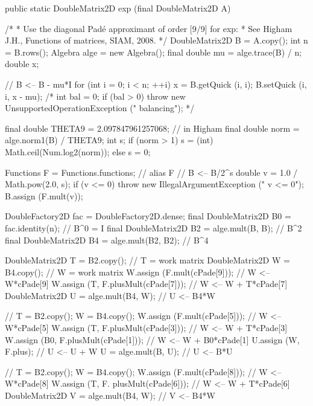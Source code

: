 \begin{code}

   public static DoubleMatrix2D exp (final DoubleMatrix2D A) \begin{hide} {
      /*
       * Use the diagonal Padé approximant of order [9/9] for exp:
       * See Higham J.H., Functions of matrices, SIAM, 2008.
       */
      DoubleMatrix2D B = A.copy();
      int n = B.rows();
      Algebra alge = new Algebra();
      final double mu = alge.trace(B) / n;
      double x;

      // B <-- B - mu*I
      for (int i = 0; i < n; ++i) {
         x = B.getQuick (i, i);
         B.setQuick (i, i, x - mu);
      }
      /*
      int bal = 0;
      if (bal > 0) {
         throw new UnsupportedOperationException ("   balancing");
      } */

      final double THETA9 = 2.097847961257068;   // in Higham
      final double norm = alge.norm1(B) / THETA9;
      int s;
      if (norm > 1)
         s = (int) Math.ceil(Num.log2(norm));
      else
         s = 0;

      Functions F = Functions.functions;    // alias F
      // B <-- B/2^s
      double v = 1.0 / Math.pow(2.0, s);
      if (v <= 0)
          throw new IllegalArgumentException ("   v <= 0");
      B.assign (F.mult(v));

      DoubleFactory2D fac = DoubleFactory2D.dense;
      final DoubleMatrix2D B0 = fac.identity(n);    // B^0 = I
      final DoubleMatrix2D B2 = alge.mult(B, B);    // B^2
      final DoubleMatrix2D B4 = alge.mult(B2, B2);  // B^4

      DoubleMatrix2D T = B2.copy();          // T = work matrix
      DoubleMatrix2D W = B4.copy();          // W = work matrix
      W.assign (F.mult(cPade[9]));           // W <-- W*cPade[9]
      W.assign (T, F.plusMult(cPade[7]));    // W <-- W + T*cPade[7]
      DoubleMatrix2D U = alge.mult(B4, W);   // U <-- B4*W

      // T = B2.copy();
      W = B4.copy();
      W.assign (F.mult(cPade[5]));           // W <-- W*cPade[5]
      W.assign (T, F.plusMult(cPade[3]));    // W <-- W + T*cPade[3]
      W.assign (B0, F.plusMult(cPade[1]));   // W <-- W + B0*cPade[1]
      U.assign (W, F.plus);                  // U <-- U + W
      U = alge.mult(B, U);                   // U <-- B*U

      // T = B2.copy();
      W = B4.copy();
      W.assign (F.mult(cPade[8]));           // W <-- W*cPade[8]
      W.assign (T, F. plusMult(cPade[6]));   // W <-- W + T*cPade[6]
      DoubleMatrix2D V = alge.mult(B4, W);   // V <-- B4*W

}
\end{hide}
\end{code}
